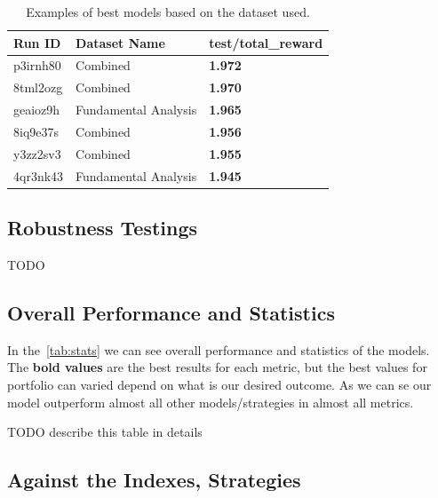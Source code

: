\documentclass[../xlapes02]{subfiles}
\begin{document}
    \begin{table}
        \centering
        \label{tab:best-datasets}
        \begin{tabular}{|l|l|l|}
            \hline
            \textbf{Run ID} & \textbf{Dataset Name} & \textbf{test/total\_reward}                \\ \hline
            p3irnh80        & Combined              & \textcolor[RGB]{50,150,50}{\textbf{1.972}} \\ \hline
            8tml2ozg        & Combined              & \textcolor[RGB]{50,150,50}{\textbf{1.970}} \\ \hline
            geaioz9h        & Fundamental Analysis  & \textcolor[RGB]{50,150,50}{\textbf{1.965}} \\ \hline
            8iq9e37s        & Combined              & \textcolor[RGB]{50,150,50}{\textbf{1.956}} \\ \hline
            y3zz2sv3        & Combined              & \textcolor[RGB]{50,150,50}{\textbf{1.955}} \\ \hline
            4qr3nk43        & Fundamental Analysis  & \textcolor[RGB]{50,150,50}{\textbf{1.945}} \\ \hline
        \end{tabular}
        \caption{Examples of best models based on the dataset used.}
    \end{table}

    \subsection{Robustness Testings}\label{subsec:robustness-testings}
    TODO

    \subsection{Overall Performance and Statistics}\label{subsec:overall-performance-and-statistics}
    In the~\cref{tab:stats} we can see overall performance and statistics of the models. The \textcolor[HTML]{00F000}{\textbf{bold values}} are the best results for each metric, but the best values for portfolio can varied depend on what is our desired outcome. As we can se our model outperform almost all other models/strategies in almost all metrics.

    TODO describe this table in details

    \subsection{Against the Indexes, Strategies}
\end{document}
